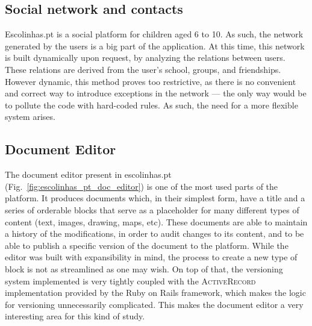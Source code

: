 \subsection{Social network and contacts}\label{sec:case-study_areas_social_network}
Escolinhas.pt is a social platform for children aged 6 to 10. As such, the network generated by the users is a big part of the application. At this time, this network is built dynamically upon request, by analyzing the relations between users. These relations are derived from the user's school, groups, and friendships. However dynamic, this method proves too restrictive, as there is no convenient and correct way to introduce exceptions in the network --- the only way would be to pollute the code with hard-coded rules. As such, the need for a more flexible system arises.

\subsection{Document Editor}\label{sec:case-study_areas_document_editor}
The document editor present in escolinhas.pt (Fig.~\ref{fig:escolinhas_pt_doc_editor}) is one of the most used parts of the platform. It produces documents which, in their simplest form, have a title and a series of orderable blocks that serve as a placeholder for many different types of content (text, images, drawing, maps, etc). These documents are able to maintain a history of the modifications, in order to audit changes to its content, and to be able to publish a specific version of the document to the platform. While the editor was built with expansibility in mind, the process to create a new type of block is not as streamlined as one may wish. On top of that, the versioning system implemented is very tightly coupled with the \textsc{ActiveRecord} implementation provided by the Ruby on Rails framework, which makes the logic for versioning unnecessarily complicated. This makes the document editor a very interesting area for this kind of study.

